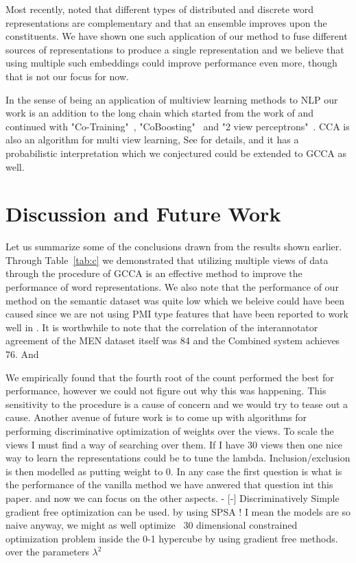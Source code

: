 \documentclass[11pt]{article}
\begin{document}
Most recently, \cite{bansal2014tailoring} noted that  different
types of distributed and discrete word representations are
complementary and that an ensemble  improves upon the
constituents. We have shown one such application of our method to fuse different
sources of representations to produce a single representation and we
believe that using multiple such embeddings could improve performance
even more, though that is not our focus for now.

In the sense of being an application of multiview
learning methods to NLP our work is an addition to the long chain which
started from the work of \cite{yarowsky1995unsupervised} and continued
with "Co-Training"~\cite{blum1998combining}, "CoBoosting"~\cite{collins1999unsupervised} and "2 view
perceptrons"~\cite{brefeld2006efficient}.  CCA is also an algorithm
for multi view learning, See \cite{kakade2007multi,ganchevuai08} for
details, and it has a probabilistic interpretation
\cite{bach2005probabilistic} which we conjectured could be extended to
GCCA as well.

\section{Discussion and Future Work}
\label{sec:futurework}
Let us summarize some of the conclusions drawn from the results shown
earlier. Through Table~\ref{tab:c} we demonstrated that utilizing
multiple views of data through the procedure of GCCA is an effective
method to improve the performance of word representations. We also
note that the performance of our method on the semantic dataset was
quite low which we beleive could have been caused since we are not
using PMI type features that have been reported to work well in
\cite{pennington2014glove,levy2014neural}. 
It is worthwhile to note that the correlation of the interannotator
agreement of the MEN dataset itself was 84 and the Combined system
achieves 76. And

We empirically found that the fourth root of the count performed the
best for performance, however we could not figure out why this was
happening. This sensitivity to the procedure is a cause of concern and
we would try to tease out a cause. Another avenue of future work is to
come up with algorithms for performing discriminative optimization of weights over the views.
To scale the views I must find a way of searching over them.
    If I have 30 views then one nice way to learn the representations could
    be to tune the lambda. Inclusion/exclusion is then modelled as
    putting weight to 0. In any case the first question is what is the
    performance of the vanilla method we have anwered that question
    int this paper. and now we can focus on the other aspects.
    - [-] Discriminatively
      Simple gradient free optimization can be used. by using SPSA !
      I mean the models are so naive anyway, we might as well optimize
      ~30 dimensional constrained optimization problem inside the 0-1
      hypercube by using gradient free methods. over the parameters $\lambda^2$
\end{document}
